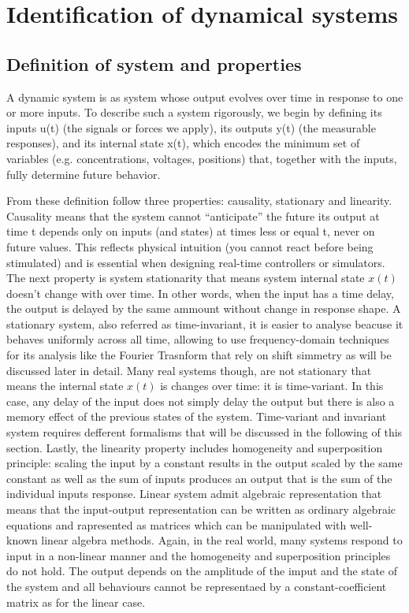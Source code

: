 \chapter{Identification of dynamical systems}

\section{Definition of system and properties}
A dynamic system is as system whose output evolves over time in response to one or more inputs.  To describe such a system rigorously, we begin by defining its inputs u(t) (the signals or forces we apply), its outputs y(t) (the measurable responses), and its internal state x(t), which encodes the minimum set of variables (e.g. concentrations, voltages, positions) that, together with the inputs, fully determine future behavior. 

From these definition follow three properties: causality, stationary and linearity. Causality means that the system cannot “anticipate” the future its output at time t depends only on inputs (and states) at times less or equal t, never on future values.  This reflects physical intuition (you cannot react before being stimulated) and is essential when designing real-time controllers or simulators. The next property is system stationarity that means system internal state $x(t)$ doesn't change with over time. In other words, when the input has a time delay, the output is delayed by the same ammount without change in response shape. A stationary system, also referred as time-invariant, it is easier to analyse beacuse it behaves uniformly across all time, allowing to use frequency-domain techniques for its analysis like the Fourier Trasnform that rely on shift simmetry as will be discussed later in detail. Many real systems though, are not stationary that means the internal state $x(t)$ is changes over time: it is time-variant. In this case, any delay of the input does not simply delay the output but there is also a memory effect of the previous states of the system. Time-variant and invariant system requires defferent formalisms that will be discussed in the following of this section. Lastly, the linearity property includes homogeneity and superposition principle: scaling the input by a constant results in the output scaled by the same constant as well as the sum of inputs produces an output that is the sum of the individual inputs response. Linear system admit algebraic representation that means that the input-output representation can be written as ordinary algebraic equations and rapresented as matrices which can be manipulated with well-known linear algebra methods. Again, in the real world, many systems respond to input in a non-linear manner and the homogeneity and superposition principles do not hold. The output depends on the amplitude of the imput and the state of the system and all behaviours cannot be representaed by a constant-coefficient matrix as for the linear case.

